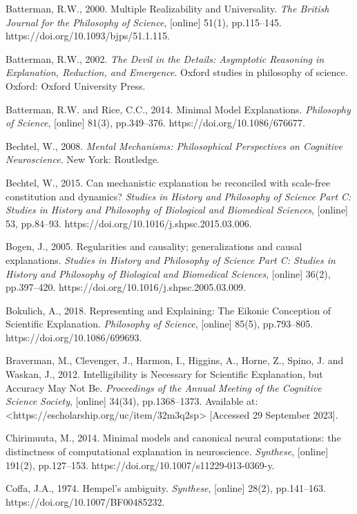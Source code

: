 Batterman, R.W., 2000. Multiple Realizability and Universality. \textit{The British Journal for the Philosophy of Science}, [online] 51(1), pp.115–145. https://doi.org/10.1093/bjps/51.1.115.

Batterman, R.W., 2002. \textit{The Devil in the Details: Asymptotic Reasoning in Explanation, Reduction, and Emergence}. Oxford studies in philosophy of science. Oxford: Oxford University Press.

Batterman, R.W. and Rice, C.C., 2014. Minimal Model Explanations. \textit{Philosophy of Science}, [online] 81(3), pp.349–376. https://doi.org/10.1086/676677.

Bechtel, W., 2008. \textit{Mental Mechanisms: Philosophical Perspectives on Cognitive Neuroscience}. New York: Routledge.

Bechtel, W., 2015. Can mechanistic explanation be reconciled with scale-free constitution and dynamics? \textit{Studies in History and Philosophy of Science Part C: Studies in History and Philosophy of Biological and Biomedical Sciences}, [online] 53, pp.84–93. https://doi.org/10.1016/j.shpsc.2015.03.006.

Bogen, J., 2005. Regularities and causality; generalizations and causal explanations. \textit{Studies in History and Philosophy of Science Part C: Studies in History and Philosophy of Biological and Biomedical Sciences}, [online] 36(2), pp.397–420. https://doi.org/10.1016/j.shpsc.2005.03.009.

Bokulich, A., 2018. Representing and Explaining: The Eikonic Conception of Scientific Explanation. \textit{Philosophy of Science}, [online] 85(5), pp.793–805. https://doi.org/10.1086/699693.

Braverman, M., Clevenger, J., Harmon, I., Higgins, A., Horne, Z., Spino, J. and Waskan, J., 2012. Intelligibility is Necessary for Scientific Explanation, but Accuracy May Not Be. \textit{Proceedings of the Annual Meeting of the Cognitive Science Society}, [online] 34(34), pp.1368–1373. Available at: {\textless}https://escholarship.org/uc/item/32m3q2sp{\textgreater} [Accessed 29 September 2023].

Chirimuuta, M., 2014. Minimal models and canonical neural computations: the distinctness of computational explanation in neuroscience. \textit{Synthese}, [online] 191(2), pp.127–153. https://doi.org/10.1007/s11229-013-0369-y.

Coffa, J.A., 1974. Hempel's ambiguity. \textit{Synthese}, [online] 28(2), pp.141–163. https://doi.org/10.1007/BF00485232.

